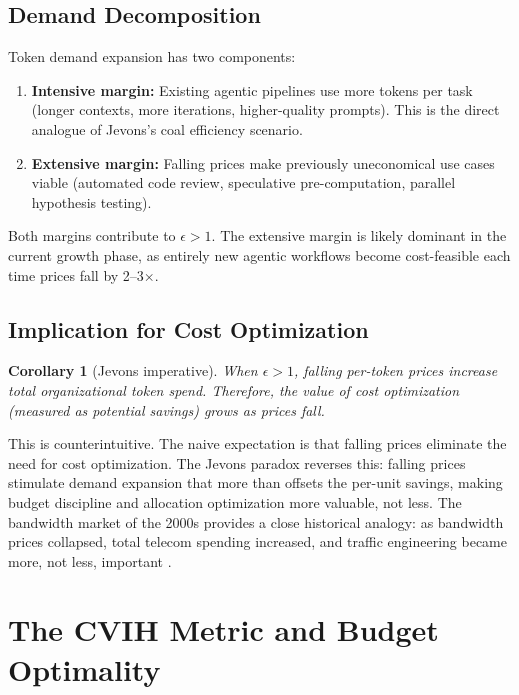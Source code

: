 \documentclass[11pt, a4paper, copyright]{googledeepmind}
\newtheorem{corollary}{Corollary}[section]
\begin{document}
\subsection{Demand Decomposition}\label{sec:jevons-demand}

Token demand expansion has two components:
\begin{enumerate}[nosep]
    \item \textbf{Intensive margin:} Existing agentic pipelines use more tokens per task (longer contexts, more iterations, higher-quality prompts). This is the direct analogue of Jevons's coal efficiency scenario.
    \item \textbf{Extensive margin:} Falling prices make previously uneconomical use cases viable (automated code review, speculative pre-computation, parallel hypothesis testing).
\end{enumerate}

Both margins contribute to $\epsilon > 1$. The extensive margin is likely dominant in the current growth phase, as entirely new agentic workflows become cost-feasible each time prices fall by 2--3$\times$.

\subsection{Implication for Cost Optimization}

\begin{corollary}[Jevons imperative]\label{cor:jevons}
When $\epsilon > 1$, falling per-token prices \emph{increase} total organizational token spend. Therefore, the value of cost optimization (measured as potential savings) grows as prices fall.
\end{corollary}

This is counterintuitive. The naive expectation is that falling prices eliminate the need for cost optimization. The Jevons paradox reverses this: falling prices stimulate demand expansion that more than offsets the per-unit savings, making budget discipline and allocation optimization more valuable, not less. The bandwidth market of the 2000s provides a close historical analogy: as bandwidth prices collapsed, total telecom spending increased, and traffic engineering became more, not less, important \citep{sorrell2009}.


\section{The CVIH Metric and Budget Optimality}\label{sec:cvih}
\end{document}
